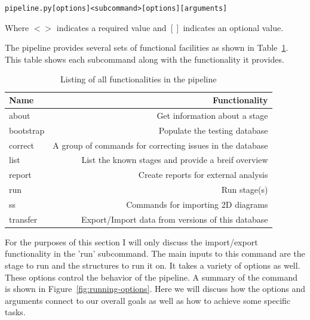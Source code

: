 \begin{alltt}
pipeline.py [options] <subcommand> [options] [arguments]
\end{alltt}

Where $<>$ indicates a required value and $[]$ indicates an optional
value.

The pipeline provides several sets of functional facilities as shown in
Table~\ref{tab:pipeline-functionality}. This table shows each subcommand along
with the functionality it provides.

\begin{table}[ht]
\begin{tabular}{lr}
\toprule
Name & Functionality \\
\midrule
about & Get information about a stage \\
bootstrap & Populate the testing database \\
correct & A group of commands for correcting issues in the database \\
list & List the known stages and provide a breif overview \\
report & Create reports for external analysis \\
run & Run stage(s) \\
ss & Commands for importing 2D diagrams \\
transfer & Export/Import data from versions of this database \\
\bottomrule
\end{tabular}
\caption{Listing of all functionalities in the pipeline}
\label{tab:pipeline-functionality}
\end{table}

For the purposes of this section I will only discuss the import/export
functionality in the 'run' subcommand. The main inputs to this command are the
stage to run and the structures to run it on. It takes a variety of options as
well. These options control the behavior of the pipeline. A summary of the
command is shown in Figure~\ref{fig:running-options}. Here we will discuss how
the options and arguments connect to our overall goals as well as how to achieve
some specific tasks.


